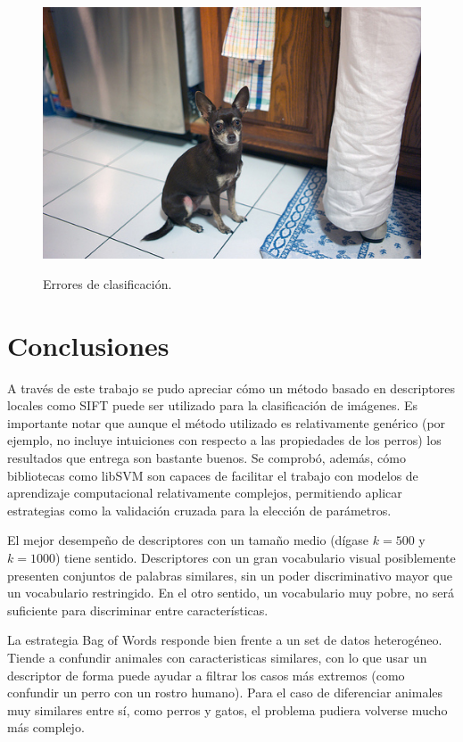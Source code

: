 \documentclass[12pt]{article}
\begin{document}
\begin{figure}[H]
{  \includegraphics[scale=0.4]{../dogs/eval/194.jpg}}
    \caption{Errores de clasificación.}
\end{figure}

\section{Conclusiones}

A través de este trabajo se pudo apreciar cómo un método basado en descriptores
locales como SIFT puede ser utilizado para la clasificación de imágenes. Es
importante notar que aunque el método utilizado es relativamente genérico (por
ejemplo, no incluye intuiciones con respecto a las propiedades de los perros)
los resultados que entrega son bastante buenos. Se comprobó, además, cómo
bibliotecas como libSVM son capaces de facilitar el trabajo con modelos de
aprendizaje computacional relativamente complejos, permitiendo aplicar
estrategias como la validación cruzada para la elección de parámetros.

El mejor desempeño de descriptores con un tamaño medio (dígase $k=500$ y
$k=1000$) tiene sentido. Descriptores con un gran vocabulario visual
posiblemente presenten conjuntos de palabras similares, sin un poder
discriminativo mayor que un vocabulario restringido. En el otro sentido, un
vocabulario muy pobre, no será suficiente para discriminar entre
características.

La estrategia Bag of Words responde bien frente a un set de datos heterogéneo.
Tiende a confundir animales con caracteristicas similares, con lo que usar un descriptor
de forma puede ayudar a filtrar los casos más extremos (como confundir un
perro con un rostro humano).  Para el caso de diferenciar animales muy similares
entre sí, como perros y gatos, el problema pudiera volverse mucho más complejo. 





\end{document}
